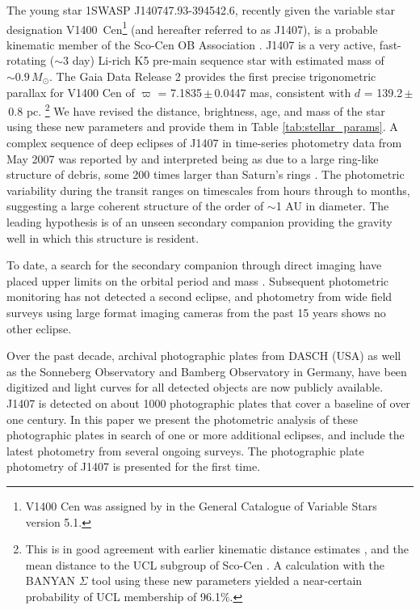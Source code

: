 \documentclass[twocolumn]{aa}
\begin{document}
The young star 1SWASP J140747.93-394542.6, recently given the variable star designation V1400~Cen\footnote{V1400 Cen was assigned by \citet{Samus17} in the General Catalogue of Variable Stars version 5.1.} (and hereafter referred to as J1407), is a probable kinematic member of the Sco-Cen OB Association \citep{Mamajek12,Pecaut16}.
%
J1407 is a very active, fast-rotating ($\sim$3 day) Li-rich K5 pre-main sequence star with estimated mass of $\sim 0.9\,M_\odot$.
%
The Gaia Data Release 2 \citep{Gaia16,Gaia18} provides the first precise trigonometric parallax for V1400 Cen of $\varpi$ = 7.1835\,$\pm$\,0.0447 mas, consistent with $d$ = 139.2\,$\pm$\,0.8 pc.
%
\footnote{This is in good agreement with earlier kinematic distance estimates \citep[128\,$\pm$\,13 pc;][]{Mamajek12}, and the mean distance to the UCL subgroup of Sco-Cen \citep[142\,pc;][]{deZeeuw99}.
%
A calculation with the BANYAN $\Sigma$ tool\citep{Gagne18} using these new parameters yielded a near-certain probability of UCL membership of 96.1$\%$.}
%
We have revised the distance, brightness, age, and mass of the star using these new parameters and provide them in Table \ref{tab:stellar_params}.
%
A complex sequence of deep eclipses of J1407 in time-series photometry
data from May 2007 was reported by \citet{Mamajek12} and interpreted being as due to a large ring-like structure of debris, some 200 times larger than Saturn's rings \citep{Mamajek12,vanWerkhoven14,Kenworthy15b}.
%
The photometric variability during the transit ranges on timescales from hours through to months, suggesting a large coherent structure of the order of $\sim$1 AU in diameter.
%
The leading hypothesis is of an unseen secondary companion providing the gravity well in which this structure is resident.

To date, a search for the secondary companion through direct imaging have placed upper limits on the orbital period and mass \citep{Kenworthy15}.
%
Subsequent photometric monitoring has not detected a second eclipse, and photometry from wide field surveys using large format imaging cameras from the past 15 years shows no other eclipse.

Over the past decade, archival photographic plates from DASCH (USA) as well as the Sonneberg Observatory and Bamberg Observatory in Germany, have been digitized and light curves for all detected objects are now publicly available.
%
J1407 is detected on about 1000 photographic plates that cover a baseline of over one century.
%
In this paper we present the photometric analysis of these photographic plates in search of one or more additional eclipses, and include the latest photometry from several ongoing surveys.
%
The photographic plate photometry of J1407 is presented for the first time.
\end{document}
